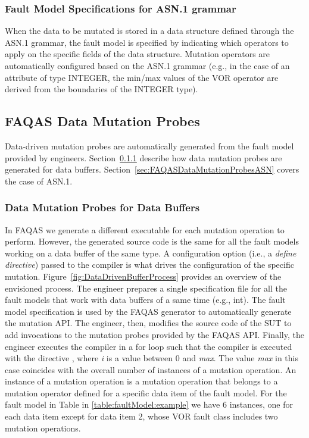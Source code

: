 \clearpage
\subsubsection{Fault Model Specifications for ASN.1 grammar}

When the data to be mutated is stored in a data structure defined through the ASN.1 grammar, the fault model is specified by indicating which operators to apply on the specific fields of the data structure. Mutation operators are automatically configured based on the ASN.1 grammar (e.g., in the case of an attribute of type INTEGER, the min/max values of the VOR operator are derived from the boundaries of the INTEGER type).

\clearpage
\subsection{FAQAS Data Mutation Probes}
\label{sec:FAQASDataMutationProbes}

Data-driven mutation probes are automatically generated from the fault model provided by engineers.
Section~\ref{sec:FAQASDataMutationProbesBuffer} describe how data mutation probes are generated for data buffers.
Section~\ref{sec:FAQASDataMutationProbesASN} covers the case of ASN.1.


\subsubsection{Data Mutation Probes for Data Buffers}
\label{sec:FAQASDataMutationProbesBuffer}

In FAQAS we generate a different executable for each mutation operation to perform. However, the generated source code is the same for all the fault models working on a data buffer of the same type. A configuration option (i.e., a \emph{define directive}) passed to the compiler is what drives the configuration of the specific mutation. Figure~\ref{fig:DataDrivenBufferProcess} provides an overview of the envisioned process. The engineer prepares a single specification file for all the fault models that work with data buffers of a same time (e.g., int). The fault model specification is used by the FAQAS generator to automatically generate the mutation API. The engineer, then, modifies the source code of the SUT to add invocations to the mutation probes provided by the FAQAS API. Finally, the engineer executes the compiler in a for loop such that the compiler is executed with the directive , where \emph{i} is a value between 0 and \emph{max}. The value \emph{max} in this case coincides with the
overall number of instances of a mutation operation. An instance of a mutation operation is a mutation operation that belongs to a mutation operator defined for a specific data item of the fault model. For the fault model in Table in \ref{table:faultModel:example} we have 6 instances, one for each data item except for data item 2, whose VOR fault class includes two mutation operations.

